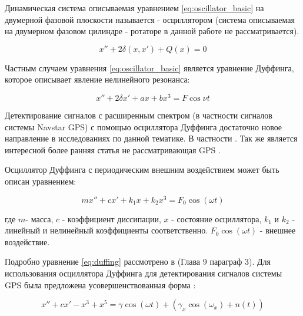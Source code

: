 Динамическая система описываемая уравнением \ref{eq:oscillator_basic} на двумерной фазовой плоскости называется - осциллятором (система
описываемая на двумерном фазовом цилиндре - ротаторе в данной работе не рассматривается)\cite{chaos_neimark_landa}.
\begin{center}
\begin{equation}
	\label{eq:oscillator_basic}
	x'' + 2\delta(x, x') + Q(x) = 0
\end{equation}
\end{center}

Частным случаем уравнения \ref{eq:oscillator_basic} является уравнение Дуффинга, которое описывает явление нелинейного резонанса:
\begin{center}
\begin{equation}
	\label{eq:oscillator_duffing}
	x'' + 2\delta{x'} + ax +bx^3 = F\cos{\nu{t}}
\end{equation}
\end{center}

Детектирование сигналов с расширенным спектром (в частности сигналов системы Navstar GPS) с помощью осциллятора Дуффинга
достаточно новое направление в исследованиях по данной тематике. В частности
\cite{chaos_chen, chaos_cambridge, chaos_huang, chaos_song}. Так же является интересной более ранняя статья не рассматривающая GPS
\cite{chaos_wang}.

Осциллятор Дуффинга с периодическим внешним воздействием может быть описан уравнением:
\begin{center}
\begin{equation}
	\label{eq:duffing}
	mx'' + cx' + k_{1}x + k_{2}x^3 = F_{0}\cos(\omega{t})
\end{equation}
\end{center}

где
$m$- масса,
$c$ - коэффициент диссипации,
$x$ - состояние осциллятора,
$k_1$ и $k_2$ - линейный и нелинейный коэффициенты соответственно.
$F_{0}\cos(\omega{t})$ - внешнее воздействие.

Подробно уравнение \ref{eq:duffing} рассмотрено в \cite{chaos_neimark_landa} (Глава 9 параграф 3).
Для использования осциллятора Дуффинга для детектирования сигналов системы GPS была предложена
усовершенствованная форма \cite{chaos_song, chaos_chen}:
\begin{center}
\begin{equation}
	\label{eq:duffing_gps}
	x'' +cx' - x^3 + x^5 = \gamma\cos(\omega{t}) + (\gamma_{x}\cos(\omega_{x}) + n(t))
\end{equation}
\end{center}

